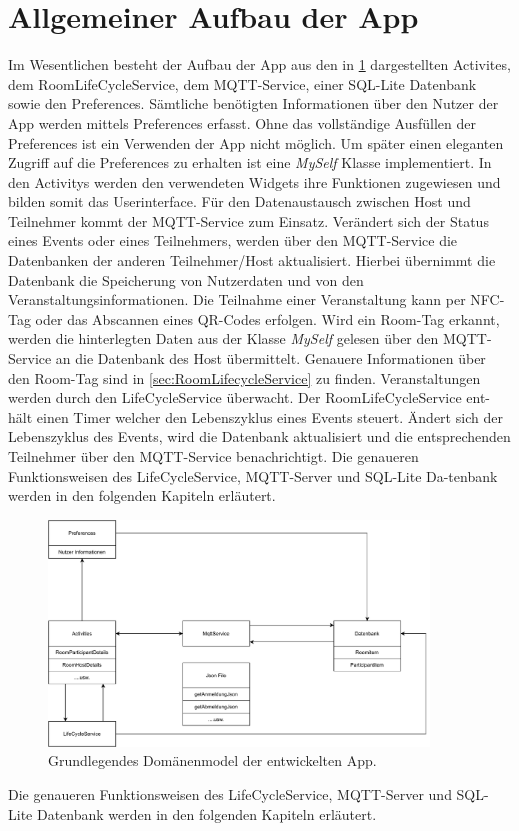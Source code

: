 \section{Allgemeiner Aufbau der App}
\label{sec:AadA}
Im Wesentlichen besteht der Aufbau der App aus den in \cref{img:dmodel} dargestellten Activites, dem RoomLifeCycleService, dem MQTT-Service, einer SQL-Lite Datenbank sowie den Preferences. 
Sämtliche benötigten Informationen über den Nutzer der App werden mittels Preferences erfasst. 
Ohne das vollständige Ausfüllen der Preferences ist ein Verwenden der App nicht möglich. 
Um später einen eleganten Zugriff auf die Preferences zu erhalten ist eine \textit{MySelf} Klasse implementiert. 
In den Activitys werden den verwendeten Widgets ihre Funktionen zugewiesen und bilden somit das Userinterface. 
Für den Datenaustausch zwischen Host und Teilnehmer kommt der MQTT-Service zum Einsatz. 
Verändert sich der Status eines Events oder eines Teilnehmers, werden über den MQTT-Service die Datenbanken der anderen Teilnehmer/Host aktualisiert. 
Hierbei übernimmt die Datenbank die Speicherung von Nutzerdaten und von den Veranstaltungsinformationen. 
Die Teilnahme einer Veranstaltung kann per NFC-Tag oder das Abscannen eines QR-Codes erfolgen. 
Wird ein Room-Tag erkannt, werden die hinterlegten Daten aus der Klasse \textit{MySelf} gelesen über den MQTT-Service an die Datenbank des Host übermittelt. 
Genauere Informationen über den Room-Tag sind in \cref{sec:RoomLifecycleService} zu finden.
Veranstaltungen werden durch den LifeCycleService überwacht. Der RoomLifeCycleService ent-hält einen Timer welcher den Lebenszyklus eines Events steuert. 
Ändert sich der Lebenszyklus des Events, wird die Datenbank aktualisiert und die entsprechenden Teilnehmer über den MQTT-Service benachrichtigt. 
Die genaueren Funktionsweisen des LifeCycleService, MQTT-Server und SQL-Lite Da-tenbank werden in den folgenden Kapiteln erläutert.
\begin{figure}
	\centering
	\includegraphics[width =0.9\textwidth]{images/DomaenenModel.pdf}
	\caption{Grundlegendes Domänenmodel der entwickelten App.}
	\label{img:dmodel}
\end{figure}
Die genaueren Funktionsweisen des LifeCycleService, MQTT-Server und SQL-Lite Datenbank werden in den folgenden Kapiteln erläutert.


